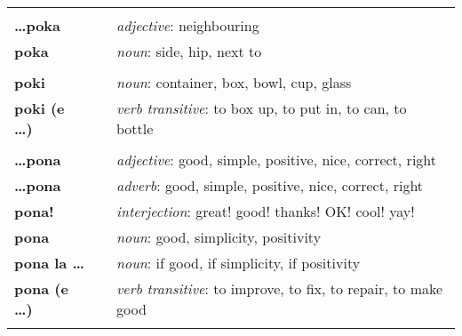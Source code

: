 \begin{supertabular}{p{2,5cm}|ll}
                                 &  &                                                                                                            \\
    \textbf{\dots poka}          &  & \textit{adjective}: neighbouring                                                                           \\
    \textbf{poka}                &  & \textit{noun}: side, hip, next to                                                                          \\
                                 &  &                                                                                                            \\
    \textbf{poki}                &  & \textit{noun}: container, box, bowl, cup, glass                                                            \\
    \textbf{poki (e \dots)}      &  & \textit{verb transitive}: to box up, to put in, to can, to bottle                                          \\
                                 &  &                                                                                                            \\
    \textbf{\dots pona}          &  & \textit{adjective}: good, simple, positive, nice, correct, right                                           \\
    \textbf{\dots pona}          &  & \textit{adverb}: good, simple, positive, nice, correct, right                                              \\
    \textbf{pona!}               &  & \textit{interjection}: great! good! thanks! OK! cool! yay!                                                 \\
    \textbf{pona}                &  & \textit{noun}: good, simplicity, positivity                                                                \\
    \textbf{pona la \dots}       &  & \textit{noun}: if good, if simplicity, if positivity                                                       \\
    \textbf{pona (e \dots)}      &  & \textit{verb transitive}: to improve, to fix, to repair, to make good                                      \\
                                 &  &                                                                                                            \\

\end{supertabular}
